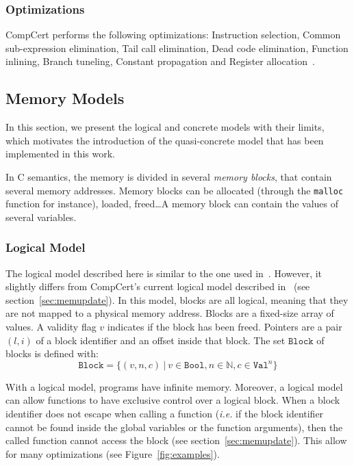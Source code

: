 \subsubsection{Optimizations}
CompCert performs the following optimizations:
Instruction selection, Common sub-expression elimination, Tail call elimination, Dead code elimination, Function inlining, Branch tuneling, Constant propagation and Register allocation~\cite{compcertoverview}.
 

\subsection{Memory Models}
\label{subsec:models}
In this section, we present the logical and concrete models with their limits, which motivates the introduction of the quasi-concrete model that has been implemented in this work.

In C semantics, the memory is divided in several \textit{memory blocks}, that contain several memory addresses. Memory blocks can be allocated (through the \texttt{malloc} function for instance), loaded, freed\dots A memory block can contain the values of several variables. 
\subsubsection{Logical Model}
The logical model described here is similar to the one used in~\cite{DBLP:conf/pldi/KangHMGZV15}. However, it slightly differs from CompCert's current logical model described in~\cite{leroy:hal-00703441} (see section~\ref{sec:memupdate}).
In this model, blocks are all logical, meaning that they are not mapped to a physical memory address.
Blocks are a fixed-size array of values.
A validity flag $v$ indicates if the block has been freed.
Pointers are a pair $(l,i)$ of a block identifier and an offset inside that block.
The set $\texttt{Block}$ of blocks is defined with:
$$\texttt{Block}=\{(v,n,c)~|~v\in\texttt{Bool},n\in\mathbb{N},c\in\texttt{Val}^{n}\}$$

With a logical model, programs have infinite memory.
Moreover, a logical model can allow functions to have exclusive control over a logical block.
When a block identifier does not escape when calling a function (\textit{i.e.} if the block identifier cannot be found inside the global variables or the function arguments), then the called function cannot access the block (see section~\ref{sec:memupdate}).%
This allow for many optimizations (see Figure~\ref{fig:examples}).

